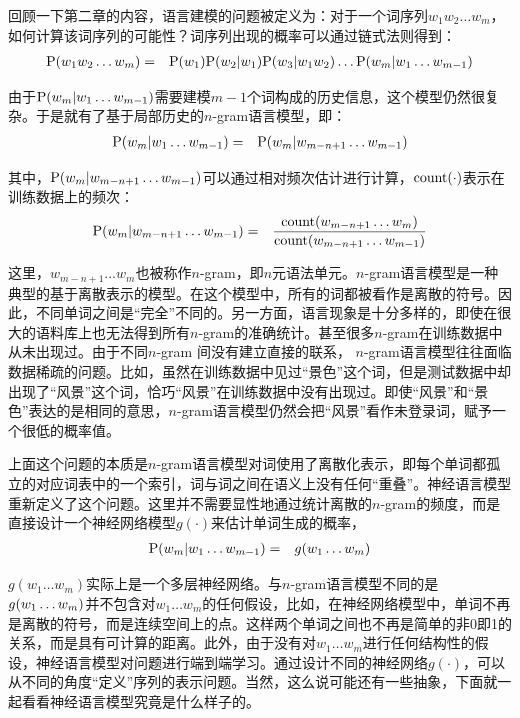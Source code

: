 \parinterval  回顾一下第二章的内容，语言建模的问题被定义为：对于一个词序列$ w_1w_2\dots w_m$，如何计算该词序列的可能性？词序列出现的概率可以通过链式法则得到：
\begin{eqnarray}
{\rm P}(w_1w_2\dots w_m)&=&{\rm P}(w_1){\rm P}(w_2|w_1){\rm P}(w_3|w_1w_2)\dots {\rm P}(w_m|w_1\dots w_{m-1})
\label{eq:5-57}
\end{eqnarray}

\parinterval  由于$ {\rm P}(w_m|w_1\dots w_{m-1}) $需要建模$ m-1 $个词构成的历史信息，这个模型仍然很复杂。于是就有了基于局部历史的$n$-gram语言模型，即：
\begin{eqnarray}
{\rm P}(w_m|w_1\dots w_{m-1})&=&{\rm P}(w_m|w_{m-n+1}\dots w_{m-1})
\label{eq:5-58}
\end{eqnarray}

\noindent  其中，$ {\rm P}(w_m|w_{m-n+1}\dots w_{m-1}) $可以通过相对频次估计进行计算，$ {\rm{count}}(\cdot) $表示在训练数据上的频次：
\begin{eqnarray}
{\rm P}(w_m|w_{m-n+1}\dots w_{m-1})&=&\frac{{\rm{count}}(w_{m-n+1}\dots w_m)}{{\rm{count}}(w_{m-n+1}\dots w_{m-1})}
\label{}
\end{eqnarray}

\noindent 这里，$ w_{m-n+1}\dots w_m $也被称作$n$-gram，即$ n $元语法单元。$n$-gram语言模型是一种典型的基于离散表示的模型。在这个模型中，所有的词都被看作是离散的符号。因此，不同单词之间是``完全''不同的。另一方面，语言现象是十分多样的，即使在很大的语料库上也无法得到所有$n$-gram的准确统计。甚至很多$n$-gram在训练数据中从未出现过。由于不同$n$-gram 间没有建立直接的联系， $n$-gram语言模型往往面临数据稀疏的问题。比如，虽然在训练数据中见过``景色''这个词，但是测试数据中却出现了``风景''这个词，恰巧``风景''在训练数据中没有出现过。即使``风景''和``景色''表达的是相同的意思，$n$-gram语言模型仍然会把``风景''看作未登录词，赋予一个很低的概率值。

\parinterval  上面这个问题的本质是$n$-gram语言模型对词使用了离散化表示，即每个单词都孤立的对应词表中的一个索引，词与词之间在语义上没有任何``重叠''。神经语言模型重新定义了这个问题。这里并不需要显性地通过统计离散的$n$-gram的频度，而是直接设计一个神经网络模型$ g(\cdot)$来估计单词生成的概率，
\begin{eqnarray}
{\rm P}(w_m|w_1\dots w_{m-1})&=&g(w_1\dots w_m)
\label{eq:5-59}
\end{eqnarray}

\vspace{-0.4em}
\parinterval  $ g(w_1\dots w_m) $实际上是一个多层神经网络。与$n$-gram语言模型不同的是$ g(w_1\dots \\ w_m) $并不包含对$ w_1\dots w_m $的任何假设，比如，在神经网络模型中，单词不再是离散的符号，而是连续空间上的点。这样两个单词之间也不再是简单的非0即1的关系，而是具有可计算的距离。此外，由于没有对$ w_1\dots w_m $进行任何结构性的假设，神经语言模型对问题进行端到端学习。通过设计不同的神经网络$ g(\cdot)$，可以从不同的角度``定义''序列的表示问题。当然，这么说可能还有一些抽象，下面就一起看看神经语言模型究竟是什么样子的。

